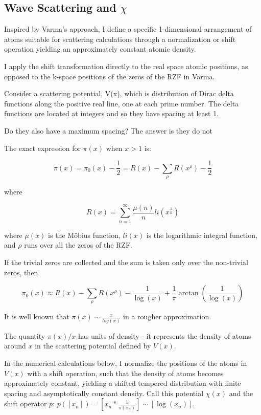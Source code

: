 \documentclass[11pt, oneside]{article}   	%
\begin{document}
\subsection{Wave Scattering and $\chi$}
Inspired by Varma's approach, \cite{Varma2016} I define a specific 1-dimensional arrangement of atoms suitable for scattering calculations through a normalization or shift operation yielding an approximately constant atomic density.

I apply the shift transformation directly to the real space atomic positions, as opposed to the k-space positions of the zeros of the RZF in Varma.

Consider a scattering potential, V(x), which is distribution of Dirac delta functions along the positive real line, one at each prime number. 
The delta functions are located at integers and so they have spacing at least 1.

Do they also have a maximum spacing? The answer is they do not \cite{PrimeSpacing}

The exact expression \cite{Riemann} for $\pi(x)$ when $x>1$ is:

\begin{equation}
\pi(x) = \pi_0(x) - \frac{1}{2} = R(x) - \sum_{\rho}R(x^{\rho}) - \frac{1}{2}
\end{equation}

where

\begin{equation}
R(x) = \sum_{n=1}^{\infty}\frac{\mu(n)}{n}li(x^{\frac{1}{n}})
\end{equation}

where $\mu(x)$ is the M\"obius function, $li(x)$ is the logarithmic integral function, and $\rho$ runs over all the zeros of the RZF.

If the trivial zeros are collected and the sum is taken only over the non-trivial zeros, then

\begin{equation}
\pi_0(x) \approx R(x) - \sum_{\rho}R(x^{\rho}) - \frac{1}{\log(x)} + \frac{1}{\pi}\arctan(\frac{1}{\log(x)})
\end{equation}
 
It is well known that $\pi(x) \sim \frac{x}{log(x)}$ in a rougher approximation.

The quantity $\pi(x)/x$ has units of density - it represents the density of atoms around $x$ in the scattering potential defined by $V(x)$.

In the numerical calculations below, I normalize the positions of the atoms in $V(x)$ with a shift operation, such that the density of atoms becomes approximately constant, yielding a shifted tempered distribution with finite spacing and asymptotically constant density. Call this potential $\chi(x)$ and the shift operator $p$: $p([x_n]) = [x_n * \frac{1}{\pi(x_n)}] \sim [\log(x_n)]$.
\end{document}

